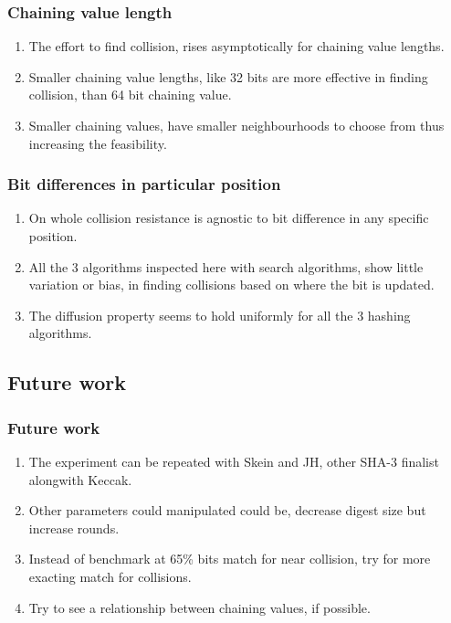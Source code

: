\documentclass{beamer}
\begin{document}
\begin{frame}
\frametitle{Chaining value length}
\begin{enumerate}
\item The effort to find collision, rises asymptotically for chaining value lengths.
\item Smaller chaining value lengths, like 32 bits are more effective in finding collision, than 64 bit
chaining value.
\item Smaller chaining values, have smaller neighbourhoods to choose from thus increasing the feasibility.
\end{enumerate}
\end{frame}

\begin{frame}
\frametitle{Bit differences in particular position}
\begin{enumerate}
\item On whole collision resistance is agnostic to bit difference in any specific position.
\item All the 3 algorithms inspected here with search algorithms, show little variation or bias, in finding
collisions based on where the bit is updated.
\item The diffusion property seems to hold uniformly for all the 3 hashing algorithms.
\end{enumerate}
\end{frame}

\subsection{Future work}

\begin{frame}
\frametitle{Future work}
\begin{enumerate}
\item The experiment can be repeated with Skein and JH, other SHA-3 finalist alongwith Keccak.
\item Other parameters could manipulated could be, decrease digest size but increase rounds.
\item Instead of benchmark at 65\% bits match for near collision, try for more exacting match
for collisions.
\item Try to see a relationship between chaining values, if possible.
\end{enumerate}
\end{frame}
\end{document}
